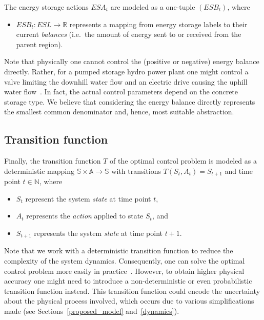The energy storage actions $ESA_t$ are modeled as a one-tuple $(ESB_t)$, where
\begin{itemize}
	\item $ESB_t: ESL \rightarrow \mathbb{R}$ represents a mapping from energy storage labels to their current \textit{balances} (i.e.\ the amount of energy sent to or received from the parent region).
\end{itemize}
Note that physically one cannot control the (positive or negative) energy balance directly. Rather, for a pumped storage hydro power plant one might control a valve limiting the downhill water flow and an electric drive causing the uphill water flow~\cite{Castronuovo2004}. In fact, the actual control parameters depend on the concrete storage type. We believe that considering the energy balance directly represents the smallest common denominator and, hence, most suitable abstraction.

\subsection{Transition function}
\label{transitions}

Finally, the transition function $T$ of the optimal control problem is modeled as a deterministic mapping $\mathbb{S} \times \mathbb{A} \rightarrow \mathbb{S}$ with transitions $T(S_t, A_t) = S_{t+1}$ and time point $t \in \mathbb{N}$, where
\begin{itemize}
	\item $S_t$ represent the system \textit{state} at time point $t$,
	\item $A_t$ represents the \textit{action} applied to state $S_t$, and
	\item $S_{t+1}$ represents the system \textit{state} at time point $t+1$.
\end{itemize}
Note that we work with a deterministic transition function to reduce the complexity of the system dynamics. Consequently, one can solve the optimal control problem more easily in practice~\cite{Bertsekas1995}. However, to obtain higher physical accuracy one might need to introduce a non-deterministic or even probabilistic transition function instead. This transition function could encode the uncertainty about the physical process involved, which occurs due to various simplifications made (see Sections~\ref{proposed_model} and~\ref{dynamics}).

